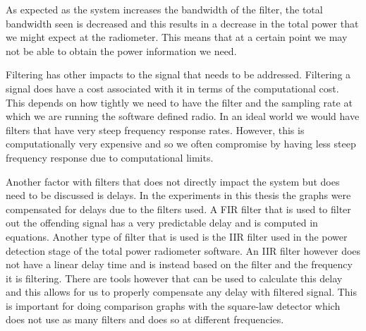 As expected as the system increases the bandwidth of the filter, the total bandwidth seen is decreased and this results in a decrease in the total power that we might expect at the radiometer.  This means that at a certain point we may not be able to obtain the power information we need.

Filtering has other impacts to the signal that needs to be addressed.  Filtering a signal does have a cost associated with it in terms of the computational cost.  This depends on how tightly we need to have the filter and the sampling rate at which we are running the software defined radio.  In an ideal world we would have filters that have very steep frequency response rates.  However, this is computationally very expensive and so we often compromise by having less steep frequency response due to computational limits.  

Another factor with filters that does not directly impact the system but does need to be discussed is delays.  In the experiments in this thesis the graphs were compensated for delays due to the filters used.  A FIR filter that is used to filter out the offending signal has a very predictable delay and is computed in equations.  Another type of filter that is used is the IIR filter used in the power detection stage of the total power radiometer software.  An IIR filter however does not have a linear delay time and is instead based on the filter and the frequency it is filtering.  There are tools however that can be used to calculate this delay and this allows for us to properly compensate any delay with filtered signal.  This is important for doing comparison graphs with the square-law detector which does not use as many filters and does so at different frequencies.  





